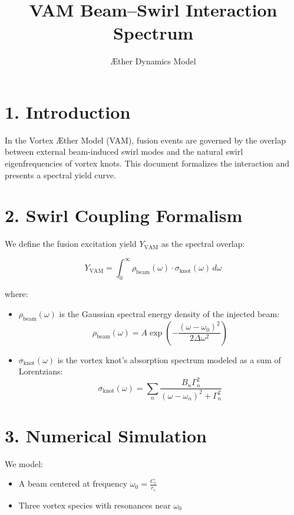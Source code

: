 \documentclass{article}
\title{VAM Beam--Swirl Interaction Spectrum}
\author{Æther Dynamics Model}
\date{}
\begin{document}
\maketitle

\section*{1. Introduction}
In the Vortex Æther Model (VAM), fusion events are governed by the overlap between external beam-induced swirl modes and the natural swirl eigenfrequencies of vortex knots. This document formalizes the interaction and presents a spectral yield curve.

\section*{2. Swirl Coupling Formalism}
We define the fusion excitation yield $Y_{\mathrm{VAM}}$ as the spectral overlap:

\begin{equation}
Y_{\mathrm{VAM}} = \int_0^\infty \rho_{\mathrm{beam}}(\omega) \cdot \sigma_{\mathrm{knot}}(\omega) \, d\omega
\end{equation}

\noindent where:
\begin{itemize}
  \item $\rho_{\mathrm{beam}}(\omega)$ is the Gaussian spectral energy density of the injected beam:
  \[
  \rho_{\mathrm{beam}}(\omega) = A \exp\left(-\frac{(\omega - \omega_0)^2}{2 \Delta \omega^2} \right)
  \]
  \item $\sigma_{\mathrm{knot}}(\omega)$ is the vortex knot's absorption spectrum modeled as a sum of Lorentzians:
  \[
  \sigma_{\mathrm{knot}}(\omega) = \sum_n \frac{B_n \Gamma_n^2}{(\omega - \omega_n)^2 + \Gamma_n^2}
  \]
\end{itemize}

\section*{3. Numerical Simulation}
We model:
\begin{itemize}
  \item A beam centered at frequency $\omega_0 = \frac{C_e}{r_c}$
  \item Three vortex species with resonances near $\omega_0$
\end{itemize}
\end{document}
